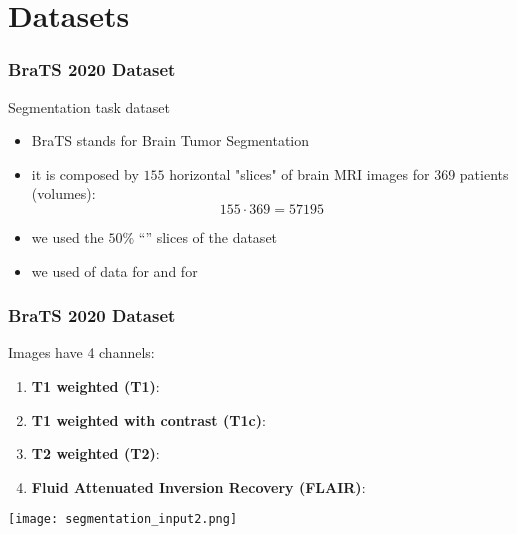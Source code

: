 \documentclass[../presentation.tex]{subfiles} %
\begin{document}
\section{Datasets}

\begin{frame}

	\frametitle{BraTS 2020 Dataset}

		Segmentation task dataset
		\begin{cbox}
			\begin{itemize}
					\item BraTS stands for Brain Tumor Segmentation
					\item it is composed by $155$ horizontal "slices" of brain MRI images
						for 369 patients (volumes): 
					\[155 \cdot 369 = 57195 \]
				\item we used the $50\%$ ``'' slices of the dataset
					\item we used  of data for  and
						 for 
			\end{itemize}
		\end{cbox}


\end{frame}

\begin{frame}
    \frametitle{BraTS 2020 Dataset}
    Images have 4 channels:
        \begin{enumerate}
            \item \textbf{T1 weighted (T1)}: 
            \item \textbf{T1 weighted with contrast (T1c)}: 
            \item \textbf{T2 weighted (T2)}: 
            \item \textbf{Fluid Attenuated Inversion Recovery (FLAIR)}:
        \end{enumerate}
        \begin{center}
            \texttt{[image: segmentation\_input2.png]}
        \end{center}
\end{frame}
\end{document}
